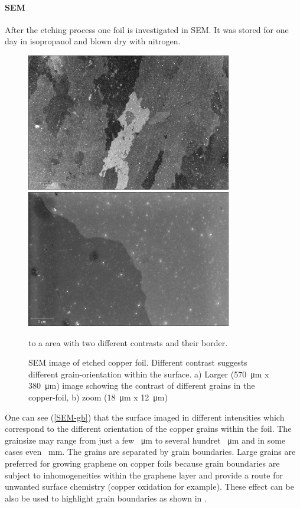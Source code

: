 \paragraph{SEM}
After the etching process one foil is investigated in SEM. It was stored for one day in isopropanol and blown dry with nitrogen. 



\begin{figure}[]
	\begin{center}
		\includegraphics[height=6cm]{./images/Domenik_16031715.jpg}
		\includegraphics[height=6cm]{./images/Domenik_16031717.jpg}
	\end{center}
	\caption{SEM image of etched copper foil. Different contrast suggests different grain-orientation within the surface. a) Larger (\SI{570}{\micro \meter} x \SI{380}{\micro \meter}) image schowing the contrast of different grains in the copper-foil, b) zoom (\SI{18}{\micro \meter} x \SI{12}{\micro \meter})} to a area with two different contrasts and their border.
	\label{SEM-gb}
\end{figure}

One can see (\autoref{SEM-gb}) that the surface imaged in different intensities which correspond to the different orientation of the copper grains within the foil\cite{wu_effects_2015}. The grainsize may range from just a few \SI{}{\micro \meter} to several hundret \SI{}{\micro \meter} and in some cases even \SI{}{\milli \meter}. The grains are separated by grain boundaries. Large grains are preferred for growing graphene on copper foils because grain boundaries are subject to inhomogeneities within the graphene layer and provide a route for unwanted surface chemistry (copper oxidation for example). These effect can be also be used to highlight grain boundaries as shown in \cite{wu_effects_2015}.

